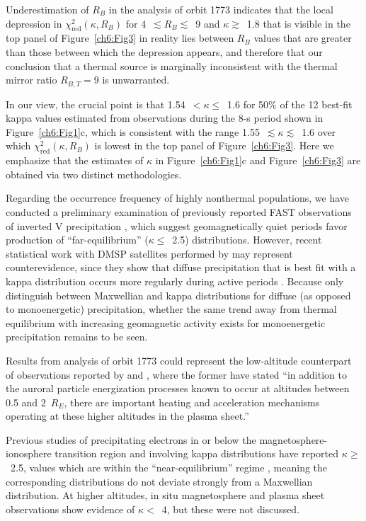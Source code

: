   Underestimation of $R_B$ in the analysis of orbit 1773 indicates that the
  local depression in $\chi^2_{\mathrm{red}} (\kappa, R_B)$ for
  4~$\lesssim R_B \lesssim$~9 and $\kappa \gtrsim$~1.8 that is visible in the top
  panel of Figure~\ref{ch6:Fig3} in reality lies between $R_B$ values that are
  greater than those between which the depression appears, and therefore that
  our conclusion that a thermal source is marginally inconsistent with the
  thermal mirror ratio $R_{B,T} = 9$ is unwarranted.

  In our view, the crucial point is that 1.54~$< \kappa \leq$~1.6 for 50\% of
  the 12 best-fit kappa values estimated from observations during the 8-s period
  shown in Figure~\ref{ch6:Fig1}c, which is consistent with the range
  1.55~$\lesssim \kappa \lesssim$~1.6 over which
  $\chi^2_{\mathrm{red}} (\kappa, R_B)$ is lowest in the top panel of
  Figure~\ref{ch6:Fig3}. Here we emphasize that the estimates of $\kappa$ in
  Figure~\ref{ch6:Fig1}c and Figure~\ref{ch6:Fig3} are obtained via two distinct
  methodologies.
  
  Regarding the occurrence frequency of highly nonthermal populations, we have
  conducted a preliminary examination of previously reported FAST observations
  of inverted V precipitation
  \citep{McFadden1998a,Carlson2001,Janhunen2001,Dombeck2013}, which suggest
  geomagnetically quiet periods favor production of ``far-equilibrium''
  ($\kappa \leq$~2.5) distributions. However, recent statistical work with DMSP
  satellites performed by \citet{McIntosh2014} may represent counterevidence,
  since they show that diffuse precipitation that is best fit with a kappa
  distribution occurs more regularly during active periods \citep[e.g., Figure~7
  in][]{McIntosh2014}. Because \citet{McIntosh2014} only distinguish between
  Maxwellian and kappa distributions for diffuse (as opposed to monoenergetic)
  precipitation, whether the same trend away from thermal equilibrium with
  increasing geomagnetic activity exists for monoenergetic precipitation remains
  to be seen.

  Results from analysis of orbit 1773 could represent the low-altitude
  counterpart of observations reported by \citet{Wygant2002} and
  \citet{Schriver2003}, where the former have stated ``in addition to the
  auroral particle energization processes known to occur at altitudes between
  0.5 and 2~$R_E$, there are important heating and acceleration mechanisms
  operating at these higher altitudes in the plasma sheet.''

  Previous studies of precipitating electrons in or below the
  magnetosphere-ionosphere transition region and involving kappa distributions
  \citep{Olsson1998,Ogasawara2006,Kaeppler2014a} have reported $\kappa
  \geq$~2.5, values which are within the ``near-equilibrium'' regime
  \citep{Livadiotis2010}, meaning the corresponding distributions do not deviate
  strongly from a Maxwellian distribution. At higher altitudes, in situ
  magnetosphere and plasma sheet observations
  \citet{Christon1989,Christon1991,Kletzing2003} show evidence of $\kappa <$~4,
  but these were not discussed.

